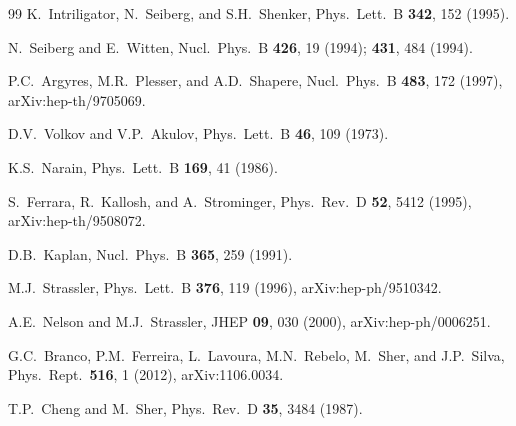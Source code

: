 \documentclass[11pt,a4paper]{article}
\begin{document}
\begin{thebibliography}{99}
  K.~Intriligator, N.~Seiberg, and S.H.~Shenker,
  Phys.\ Lett.\ B \textbf{342}, 152 (1995).

  N.~Seiberg and E.~Witten,
  Nucl.\ Phys.\ B \textbf{426}, 19 (1994);
  \textbf{431}, 484 (1994).

  P.C.~Argyres, M.R.~Plesser, and A.D.~Shapere,
  Nucl.\ Phys.\ B \textbf{483}, 172 (1997),
  arXiv:hep-th/9705069.

  D.V.~Volkov and V.P.~Akulov,
  Phys.\ Lett.\ B \textbf{46}, 109 (1973).

  K.S.~Narain,
  Phys.\ Lett.\ B \textbf{169}, 41 (1986).

  S.~Ferrara, R.~Kallosh, and A.~Strominger,
  Phys.\ Rev.\ D \textbf{52}, 5412 (1995),
  arXiv:hep-th/9508072.

  D.B.~Kaplan,
  Nucl.\ Phys.\ B \textbf{365}, 259 (1991).

  M.J.~Strassler,
  Phys.\ Lett.\ B \textbf{376}, 119 (1996),
  arXiv:hep-ph/9510342.

  A.E.~Nelson and M.J.~Strassler,
  JHEP \textbf{09}, 030 (2000),
  arXiv:hep-ph/0006251.

  G.C.~Branco, P.M.~Ferreira, L.~Lavoura, M.N.~Rebelo,
  M.~Sher, and J.P.~Silva,
  Phys.\ Rept.\ \textbf{516}, 1 (2012),
  arXiv:1106.0034.

  T.P.~Cheng and M.~Sher,
  Phys.\ Rev.\ D \textbf{35}, 3484 (1987).

\end{thebibliography}

\clearpage
\tableofcontents
\end{document}

